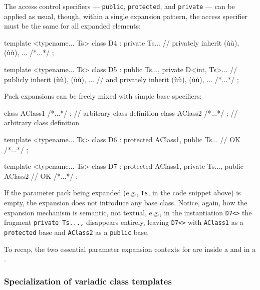 \noindent The access control specifiers --- \lstinline!public!, \lstinline!protected!,
and \lstinline!private! --- can be applied as usual, though, within a
single expansion pattern, the access specifier must be the same for all
expanded elements:

\begin{emcppslisting}[emcppsbatch=e9]
template <typename... Ts>
class D4 : private Ts...   // privately inherit (ù{}ù), (ù{}ù), ...
{ /*...*/ };

template <typename... Ts>
class D5 : public Ts..., private D<int, Ts>...
    // publicly inherit (ù{}ù), (ù{}ù), ...
    // and privately inherit (ù{}ù), (ù{}ù), ...
{ /*...*/ };
\end{emcppslisting}
    

\noindent Pack expansions can be freely mixed with simple base specifiers:

\begin{emcppslisting}
class AClass1 { /*...*/ };  // arbitrary class definition
class AClass2 { /*...*/ };  // arbitrary class definition

template <typename... Ts>
class D6 : protected AClass1, public Ts...                   // OK
{ /*...*/ };

template <typename... Ts>
class D7 : protected AClass1, private Ts..., public AClass2  // OK
{ /*...*/ };
\end{emcppslisting}
    

\noindent If the parameter pack being expanded (e.g., \lstinline!Ts!, in the code
snippet above) is empty, the expansion does not introduce any base
class. Notice, again, how the expansion mechanism is semantic, not
textual, e.g., in the instantiation \lstinline!D7<>! the fragment
\lstinline!private!~\lstinline!Ts...,! disappears entirely, leaving
\lstinline!D7<>! with \lstinline!AClass1! as a \lstinline!protected! base and
\lstinline!AClass2! as a \lstinline!public! base.

To recap, the two essential parameter expansion contexts for
 are inside a  and in a .

\subsubsection[Specialization of variadic class templates]{Specialization of variadic class templates}\label{specialization-of-variadic-class-templates}

